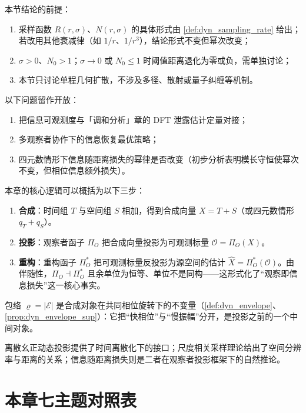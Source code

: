 \begin{remark}[适用范围与开放问题]\label{rem:dyn_information_distance_scope}
本节结论的前提：
\begin{enumerate}[label=(\roman*)]
    \item 采样函数 $R(r,\sigma)$、$N(r,\sigma)$ 的具体形式由 \cref{def:dyn_sampling_rate} 给出；若改用其他衰减律（如 $1/r$、$1/r^3$），结论形式不变但幂次改变；
    \item $\sigma>0$、$N_0>1$；$\sigma\to 0$ 或 $N_0\le 1$ 时阈值距离退化为零或负，需单独讨论；
    \item 本节只讨论单程几何扩散，不涉及多径、散射或量子纠缠等机制。
\end{enumerate}
以下问题留作开放：
\begin{enumerate}[label=(\alph*)]
    \item 把信息可观测度与「调和分析」章的 DFT 泄露估计定量对接；
    \item 多观察者协作下的信息恢复最优策略；
    \item 四元数情形下信息随距离损失的幂律是否改变（初步分析表明模长守恒使幂次不变，但相位信息额外损失）。
\end{enumerate}
\end{remark}

\begin{remark}[本章统一逻辑]\label{rem:dyn_unified_logic}
本章的核心逻辑可以概括为以下三步：
\begin{enumerate}[label=(\arabic*)]
    \item \textbf{合成}：时间组 $T$ 与空间组 $S$ 相加，得到合成向量 $X=T+S$（或四元数情形 $q_T+q_S$）。
    \item \textbf{投影}：观察者函子 $\Pi_O$ 把合成向量投影为可观测标量 $\mathcal O=\Pi_O(X)$。
    \item \textbf{重构}：重构函子 $\Pi_O^\ast$ 把可观测标量反投影为源空间的估计 $\widehat X=\Pi_O^\ast(\mathcal O)$。由伴随性，$\Pi_O\dashv\Pi_O^\ast$ 且余单位为恒等、单位不是同构——这形式化了“观察即信息损失”这一核心事实。
\end{enumerate}
包络 $\varrho=|\mathcal E|$ 是合成对象在共同相位旋转下的不变量（\cref{def:dyn_envelope}、\cref{prop:dyn_envelope_sup}）：它把“快相位”与“慢振幅”分开，是投影之前的一个中间对象。

离散幺正动态投影提供了时间离散化下的接口；尺度相关采样理论给出了空间分辨率与距离的关系；信息随距离损失则是二者在观察者投影框架下的自然推论。
\end{remark}

\section*{本章七主题对照表}

